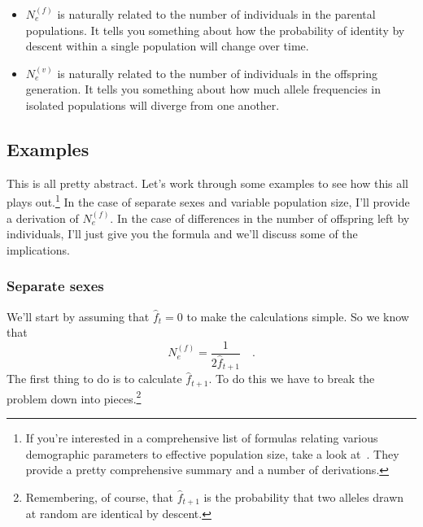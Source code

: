 \documentclass[12pt]{article}
\begin{document}
\begin{itemize}

\item $N_e^{(f)}$ is naturally related to the number of individuals in
the parental populations. It tells you something about how the
probability of identity by descent within a single population will
change over time.

\item $N_e^{(v)}$ is naturally related to the number of individuals in
the offspring generation. It tells you something about how much allele
frequencies in isolated populations will diverge from one another.

\end{itemize}

\subsection*{Examples}

This is all pretty abstract. Let's work through some examples to see
how this all plays out.\footnote{If you're interested in a
  comprehensive list of formulas relating various demographic
  parameters to effective population size, take a look
  at~\cite[p. 362]{Crow-Kimura-1970}. They provide a pretty
  comprehensive summary and a number of derivations.} In the case of
separate sexes and variable population size, I'll provide a derivation
of $N_e^{(f)}$. In the case of differences in the number of offspring
left by individuals, I'll just give you the formula and we'll discuss
some of the implications.

\subsubsection*{Separate sexes}

We'll start by assuming that $\hat f_t = 0$ to make the calculations
simple. So we know that
\[
N_e^{(f)} = \frac{1}{2\hat f_{t+1}} \quad .
\]
The first thing to do is to calculate $\hat f_{t+1}$. To do this we
have to break the problem down into pieces.\footnote{Remembering, of
course, that $\hat f_{t+1}$ is the probability that two alleles drawn
at random are identical by descent.}
\end{document}
